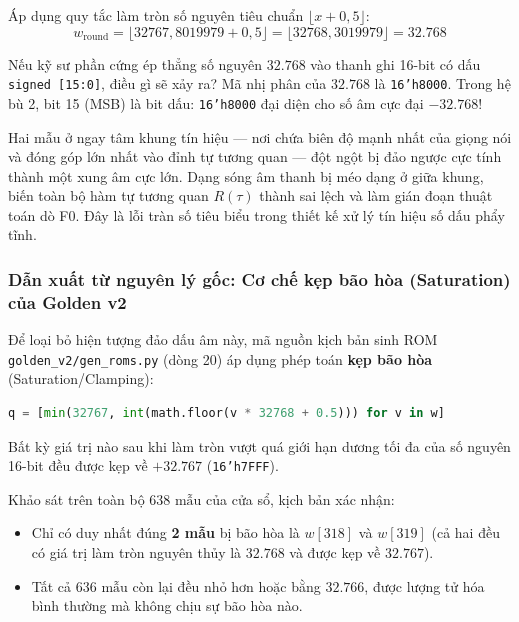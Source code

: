 Áp dụng quy tắc làm tròn số nguyên tiêu chuẩn $\lfloor x + 0{,}5 \rfloor$:
\begin{equation}
w_{\text{round}} = \lfloor 32767{,}8019979 + 0{,}5 \rfloor = \lfloor 32768{,}3019979 \rfloor = \mathbf{32.768}
\end{equation}

Nếu kỹ sư phần cứng ép thẳng số nguyên $32.768$ vào thanh ghi 16-bit có dấu \texttt{signed [15:0]}, điều gì sẽ xảy ra? Mã nhị phân của $32.768$ là \texttt{16'h8000}. Trong hệ bù 2, bit 15 (MSB) là bit dấu: \texttt{16'h8000} đại diện cho số âm cực đại $\mathbf{-32.768}$! 

Hai mẫu ở ngay tâm khung tín hiệu --- nơi chứa biên độ mạnh nhất của giọng nói và đóng góp lớn nhất vào đỉnh tự tương quan --- đột ngột bị đảo ngược cực tính thành một xung âm cực lớn. Dạng sóng âm thanh bị méo dạng ở giữa khung, biến toàn bộ hàm tự tương quan $R(\tau)$ thành sai lệch và làm gián đoạn thuật toán dò F0. Đây là lỗi tràn số tiêu biểu trong thiết kế xử lý tín hiệu số dấu phẩy tĩnh.

\subsubsection*{Dẫn xuất từ nguyên lý gốc: Cơ chế kẹp bão hòa (Saturation) của Golden v2}
Để loại bỏ hiện tượng đảo dấu âm này, mã nguồn kịch bản sinh ROM
\texttt{golden\_v2/gen\_roms.py} (dòng 20) áp dụng phép toán \textbf{kẹp bão hòa} (Saturation/Clamping):
\begin{lstlisting}[language=Python, numbers=none]
q = [min(32767, int(math.floor(v * 32768 + 0.5))) for v in w]
\end{lstlisting}

Bất kỳ giá trị nào sau khi làm tròn vượt quá giới hạn dương tối đa của số nguyên 16-bit đều được kẹp về $+32.767$ (\texttt{16'h7FFF}). 

Khảo sát trên toàn bộ $638\text{ mẫu}$ của cửa sổ, kịch bản  xác nhận:
\begin{itemize}[leftmargin=1.5em, itemsep=2pt]
    \item Chỉ có duy nhất đúng \textbf{2 mẫu} bị bão hòa là $w[318]$ và $w[319]$ (cả hai đều có giá trị làm tròn nguyên thủy là $32.768$ và được kẹp về $32.767$).
    \item Tất cả $636\text{ mẫu}$ còn lại đều nhỏ hơn hoặc bằng $32.766$, được lượng tử hóa bình thường mà không chịu sự bão hòa nào.
\end{itemize}

